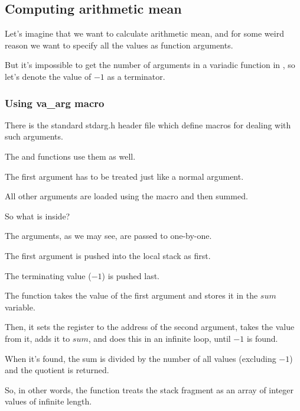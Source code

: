 \subsection{Computing arithmetic mean}

Let's imagine that we want to calculate \gls{arithmetic mean}, and for some weird reason 
we want to specify all the values as function arguments.

But it's impossible to get the number of arguments in a variadic function in \CCpp, so let's denote 
the value of $-1$ as a terminator.

\subsubsection{Using va\_arg macro}

There is the standard stdarg.h header file which define macros for dealing with such arguments.

The \printf and \scanf functions use them as well.



The first argument has to be treated just like a normal argument.

All other arguments are loaded using the  macro and then summed.

So what is inside?




The arguments, as we may see, are passed to \main one-by-one.

The first argument is pushed into the local stack as first.

The terminating value ($-1$) is pushed last.

The  function takes the value of the first argument and stores it in the $sum$ variable.

Then, it sets the \EDX register to the address of the second argument, takes the value from it, adds it to $sum$,
and does this in an infinite loop, until $-1$ is found.

When it's found, the sum is divided by the number of all values (excluding $-1$) and the \gls{quotient} is returned.

So, in other words, the function treats the stack fragment as an array of integer values of infinite
length.

